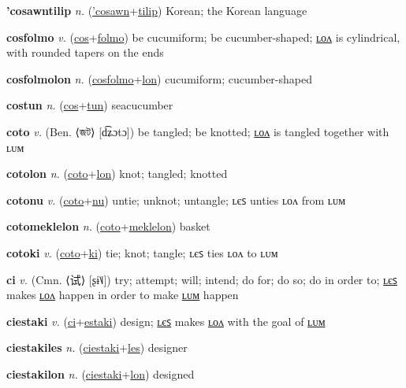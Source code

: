 \textbf{\hypertarget{'cosawntilip}{'cosawntilip}} \textit{n.} (\hyperlink{'cosawn}{'cosawn}+\allowbreak \hyperlink{tilip}{tilip})
Korean; the Korean language

\textbf{\hypertarget{cosfolmo}{cosfolmo}} \textit{v.} (\hyperlink{cos}{cos}+\allowbreak \hyperlink{folmo}{folmo})
be cucumiform; be cucumber-shaped; \hyperlink{cosfolmolon}{ʟᴏᴧ} is cylindrical, with rounded tapers on the ends

\textbf{\hypertarget{cosfolmolon}{cosfolmolon}} \textit{n.} (\hyperlink{cosfolmo}{cosfolmo}+\allowbreak \hyperlink{lon}{lon})
cucumiform; cucumber-shaped

\textbf{\hypertarget{costun}{costun}} \textit{n.} (\hyperlink{cos}{cos}+\allowbreak \hyperlink{tun}{tun})
seacucumber

\textbf{\hypertarget{coto}{coto}} \textit{v.} (Ben. ⟨{\bengali{}জট}⟩ [d͡ʑɔtɔ])
be tangled; be knotted; \hyperlink{cotolon}{ʟᴏᴧ} is tangled together with ʟᴜᴍ

\textbf{\hypertarget{cotolon}{cotolon}} \textit{n.} (\hyperlink{coto}{coto}+\allowbreak \hyperlink{lon}{lon})
knot; tangled; knotted

\textbf{\hypertarget{cotonu}{cotonu}} \textit{v.} (\hyperlink{coto}{coto}+\allowbreak \hyperlink{nu}{nu})
untie; unknot; untangle; ʟєꜱ unties ʟᴏᴧ from ʟᴜᴍ

\textbf{\hypertarget{cotomeklelon}{cotomeklelon}} \textit{n.} (\hyperlink{coto}{coto}+\allowbreak \hyperlink{meklelon}{meklelon})
basket

\textbf{\hypertarget{cotoki}{cotoki}} \textit{v.} (\hyperlink{coto}{coto}+\allowbreak \hyperlink{ki}{ki})
tie; knot; tangle; ʟєꜱ ties ʟᴏᴧ to ʟᴜᴍ

\textbf{\hypertarget{ci}{ci}} \textit{v.} (Cmn. ⟨{\chinese{}试}⟩ [ʂɨ˥˩])
try; attempt; will; intend; do for; do so; do in order to; \hyperlink{ciles}{ʟєꜱ} makes \hyperlink{cilon}{ʟᴏᴧ} happen in order to make \hyperlink{cilum}{ʟᴜᴍ} happen

\textbf{\hypertarget{ciestaki}{ciestaki}} \textit{v.} (\hyperlink{ci}{ci}+\allowbreak \hyperlink{estaki}{estaki})
design; \hyperlink{ciestakiles}{ʟєꜱ} makes \hyperlink{ciestakilon}{ʟᴏᴧ} with the goal of \hyperlink{ciestakilum}{ʟᴜᴍ}

\textbf{\hypertarget{ciestakiles}{ciestakiles}} \textit{n.} (\hyperlink{ciestaki}{ciestaki}+\allowbreak \hyperlink{les}{les})
designer

\textbf{\hypertarget{ciestakilon}{ciestakilon}} \textit{n.} (\hyperlink{ciestaki}{ciestaki}+\allowbreak \hyperlink{lon}{lon})
designed

